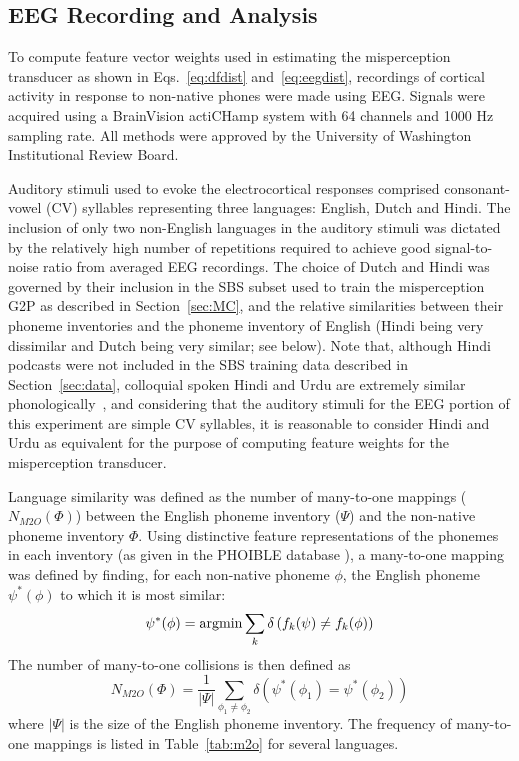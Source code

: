 \subsection{EEG Recording and Analysis}
To compute feature vector weights used in estimating the misperception
transducer as shown in Eqs.~\ref{eq:dfdist} and~\ref{eq:eegdist},
recordings of cortical activity in response to non-native phones were
made using EEG. Signals were acquired using a BrainVision actiCHamp 
system with 64 channels and 1000 Hz sampling rate.
All methods were approved by the University of Washington Institutional
Review Board.

Auditory stimuli used to evoke the electrocortical responses comprised
consonant-vowel (CV) syllables representing three languages: English,
Dutch and Hindi. The inclusion of only two non-English languages in the
auditory stimuli was dictated by the relatively high number of
repetitions required to achieve good signal-to-noise ratio from averaged
EEG recordings. The choice of Dutch and Hindi was governed by their
inclusion in the SBS subset used to train the misperception G2P as
described in Section~\ref{sec:MC}, and the relative similarities
between their phoneme inventories and the phoneme inventory of English
(Hindi being very dissimilar and Dutch being very similar; see below).
Note that, although Hindi podcasts were not included in the SBS training
data described in Section~\ref{sec:data}, colloquial spoken Hindi and
Urdu are extremely similar phonologically~\cite{Kachru90}, and
considering that the auditory stimuli for the EEG portion of this
experiment are simple CV syllables, it is reasonable to consider Hindi
and Urdu as equivalent for the purpose of computing feature weights for
the misperception transducer.

Language similarity was defined as the number of many-to-one mappings
($N_{M2O}(\mathbb{\Phi})$) between the English phoneme inventory
($\mathbb{\Psi}$) and the non-native phoneme inventory $\mathbb{\Phi}$.
Using distinctive feature representations of the phonemes in each
inventory (as given in the PHOIBLE database \cite{PHOIBLE}), a
many-to-one mapping was defined by finding, for each
non-native phoneme $\phi$, the English phoneme $\psi^*(\phi)$ to which
it is most similar:
\begin{equation}
  \psi^*(\phi) = \operatorname*{argmin} \sum_k \delta\left(f_k(\psi)\ne f_k(\phi)\right)
\end{equation}
The number of many-to-one collisions is then defined as
\begin{equation}
  N_{M2O}(\mathbb{\Phi})=\frac{1}{|\mathbb{\Psi}|}\sum_{\phi_1\ne\phi_2}
  \delta\left(\psi^*(\phi_1)=\psi^*(\phi_2)\right)
\label{eq:m2o}
\end{equation}
where $|\mathbb{\Psi}|$ is the size of the English phoneme inventory.
The frequency of many-to-one mappings is listed in
Table~\ref{tab:m2o} for several languages.

